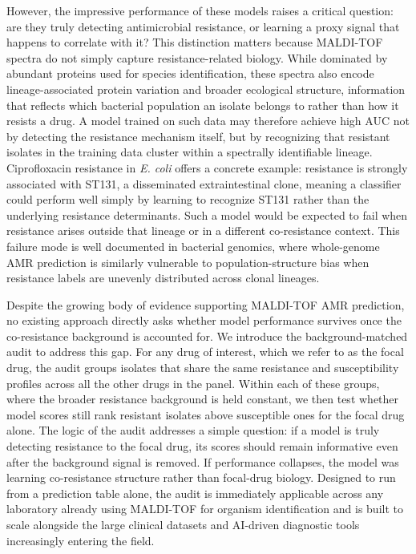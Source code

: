 \documentclass[11pt]{article}
\begin{document}
However, the impressive performance of these models raises a critical question: are they truly detecting antimicrobial resistance, or learning a proxy signal that happens to correlate with it? This distinction matters because MALDI-TOF spectra do not simply capture resistance-related biology. While dominated by abundant proteins used for species identification, these spectra also encode lineage-associated protein variation and broader ecological structure, information that reflects which bacterial population an isolate belongs to rather than how it resists a drug. A model trained on such data may therefore achieve high AUC not by detecting the resistance mechanism itself, but by recognizing that resistant isolates in the training data cluster within a spectrally identifiable lineage. Ciprofloxacin resistance in \textit{E. coli} offers a concrete example: resistance is strongly associated with ST131, a disseminated extraintestinal clone, meaning a classifier could perform well simply by learning to recognize ST131 rather than the underlying resistance determinants\cite{nicolas2014st131,price2013st131,benzakour2016st131}. Such a model would be expected to fail when resistance arises outside that lineage or in a different co-resistance context. This failure mode is well documented in bacterial genomics, where whole-genome AMR prediction is similarly vulnerable to population-structure bias when resistance labels are unevenly distributed across clonal lineages\cite{earle2016bacterialGwas,yu2025population}.

Despite the growing body of evidence supporting MALDI-TOF AMR prediction, no existing approach directly asks whether model performance survives once the co-resistance background is accounted for. We introduce the background-matched audit to address this gap. For any drug of interest, which we refer to as the focal drug, the audit groups isolates that share the same resistance and susceptibility profiles across all the other drugs in the panel. Within each of these groups, where the broader resistance background is held constant, we then test whether model scores still rank resistant isolates above susceptible ones for the focal drug alone. The logic of the audit addresses a simple question: if a model is truly detecting resistance to the focal drug, its scores should remain informative even after the background signal is removed. If performance collapses, the model was learning co-resistance structure rather than focal-drug biology. Designed to run from a prediction table alone, the audit is immediately applicable across any laboratory already using MALDI-TOF for organism identification and is built to scale alongside the large clinical datasets and AI-driven diagnostic tools increasingly entering the field.
\end{document}
